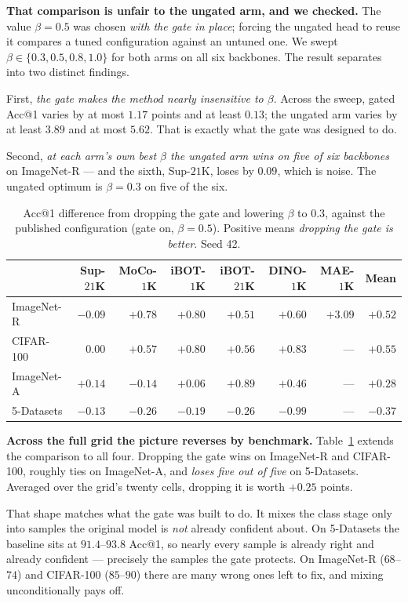 \documentclass[11pt,a4paper]{article}
\begin{document}
\textbf{That comparison is unfair to the ungated arm, and we checked.} The value
$\beta = 0.5$ was chosen \emph{with the gate in place}; forcing the ungated head
to reuse it compares a tuned configuration against an untuned one. We swept
$\beta \in \{0.3, 0.5, 0.8, 1.0\}$ for both arms on all six backbones. The
result separates into two distinct findings.

First, \emph{the gate makes the method nearly insensitive to $\beta$}. Across
the sweep, gated Acc@1 varies by at most $1.17$ points and at least $0.13$; the
ungated arm varies by at least $3.89$ and at most $5.62$. That is exactly what
the gate was designed to do.

Second, \emph{at each arm's own best $\beta$ the ungated arm wins on five of six
backbones} on ImageNet-R --- and the sixth, Sup-$21$K, loses by $0.09$, which is
noise. The ungated optimum is $\beta = 0.3$ on five of the six.

\begin{table}[htbp]
\centering
\small
\caption{Acc@1 difference from dropping the gate and lowering $\beta$ to $0.3$,
against the published configuration (gate on, $\beta = 0.5$). Positive means
\emph{dropping the gate is better}. Seed 42.}
\label{tab:gate-cross}
\begin{tabular}{@{}lrrrrrrr@{}}
\toprule
& Sup-$21$K & MoCo-$1$K & iBOT-$1$K & iBOT-$21$K & DINO-$1$K & MAE-$1$K & Mean \\
\midrule
ImageNet-R & $-0.09$ & $+0.78$ & $+0.80$ & $+0.51$ & $+0.60$ & $+3.09$ & $+0.52$ \\
CIFAR-100  & $\ \ 0.00$ & $+0.57$ & $+0.80$ & $+0.56$ & $+0.83$ & --- & $+0.55$ \\
ImageNet-A & $+0.14$ & $-0.14$ & $+0.06$ & $+0.89$ & $+0.46$ & --- & $+0.28$ \\
5-Datasets & $-0.13$ & $-0.26$ & $-0.19$ & $-0.26$ & $-0.99$ & --- & $-0.37$ \\
\bottomrule
\end{tabular}
\end{table}

\textbf{Across the full grid the picture reverses by benchmark.}
Table~\ref{tab:gate-cross} extends the comparison to all four. Dropping the gate
wins on ImageNet-R and CIFAR-100, roughly ties on ImageNet-A, and \emph{loses
five out of five} on 5-Datasets. Averaged over the grid's twenty cells, dropping
it is worth $+0.25$ points.

That shape matches what the gate was built to do. It mixes the class stage only
into samples the original model is \emph{not} already confident about. On
5-Datasets the baseline sits at $91.4$--$93.8$ Acc@1, so nearly every sample is
already right and already confident --- precisely the samples the gate protects.
On ImageNet-R ($68$--$74$) and CIFAR-100 ($85$--$90$) there are many wrong ones
left to fix, and mixing unconditionally pays off.
\end{document}
